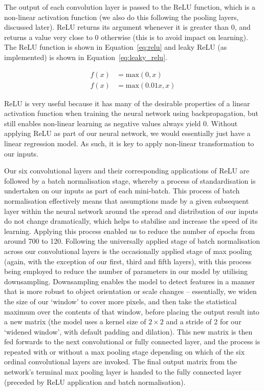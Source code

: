 \documentclass[journal,twoside]{IEEEtran}
\begin{document}
The output of each convolution layer is passed to the ReLU function, which is a non-linear activation function (we also do this following the pooling layers, discussed later). ReLU returns its argument whenever it is greater than 0, and returns a value very close to 0 otherwise (this is to avoid impact on learning). The ReLU function is shown in Equation~\ref{eq:relu} and leaky ReLU (as implemented) is shown in Equation~\ref{eq:leaky_relu}.

\begin{align}
f\left(x\right)&=\text{max}\left(0,x\right) \label{eq:relu} \\
f\left(x\right)&=\text{max}\left(0.01x,x\right) \label{eq:leaky_relu}
\end{align}

ReLU is very useful because it has many of the desirable properties of a linear activation function when training the neural network using backpropagation, but still enables non-linear learning as negative values always yield 0. Without applying ReLU as part of our neural network, we would essentially just have a linear regression model. As such, it is key to apply non-linear transformation to our inputs.

Our six convolutional layers and their corresponding applications of ReLU are followed by a batch normalisation stage, whereby a process of standardisation is undertaken on our inputs as part of each mini-batch. This process of batch normalisation effectively means that assumptions made by a given subsequent layer within the neural network around the spread and distribution of our inputs do not change dramatically, which helps to stabilise and increase the speed of its learning. Applying this process enabled us to reduce the number of epochs from around 700 to 120. Following the universally applied stage of batch normalisation across our convolutional layers is the occasionally applied stage of max pooling (again, with the exception of our first, third and fifth layers), with this process being employed to reduce the number of parameters in our model by utilising downsampling. Downsampling enables the model to detect features in a manner that is more robust to object orientation or scale changes -- essentially, we widen the size of our `window' to cover more pixels, and then take the statistical maximum over the contents of that window, before placing the output result into a new matrix (the model uses a kernel size of $2\times{}2$ and a stride of 2 for our `widened window', with default padding and dilation). This new matrix is then fed forwards to the next convolutional or fully connected layer, and the process is repeated with or without a max pooling stage depending on which of the six ordinal convolutional layers are invoked. The final output matrix from the network's terminal max pooling layer is handed to the fully connected layer (preceded by ReLU application and batch normalisation).
\end{document}
